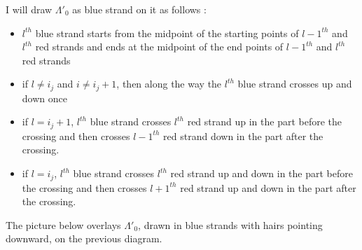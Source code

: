 I will draw $\Lambda'_0$ as blue strand on it as follows :

\begin{itemize}
\item $l^{th}$ blue strand starts from the midpoint of the starting points of $l-1^{th}$ and $l^{th}$ red strands and ends at the midpoint of the end points of $l-1^{th}$ and $l^{th}$ red strands

\item if $l \neq i_j$ and $i\neq i_j +1$, then along the way the $l^{th}$ blue strand crosses up and down once

\item if $l = i_j +1$, $l^{th}$ blue strand crosses $l^{th}$ red strand up in the part before the crossing and then crosses $l-1^{th}$ red strand down in the part after the crossing.

\item if $l = i_j$, $l^{th}$ blue strand crosses $l^{th}$ red strand up and down in the part before the crossing and then crosses $l+1^{th}$ red strand up and down in the part after the crossing.
\end{itemize}

The picture below overlays $\Lambda'_0$, drawn in blue strands with hairs pointing downward, on the previous diagram.

